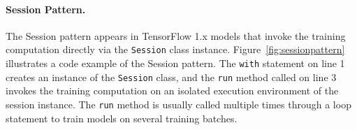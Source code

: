




\paragraph{Session Pattern.} 
The Session pattern appears in TensorFlow 1.x models that invoke the training
computation directly via the {\tt Session} class instance.
Figure~\ref{fig:sessionpattern} illustrates a code example of the Session
pattern. 
The {\tt with} statement on line 1 creates an instance of the {\tt Session}
class, and the {\tt run} method called on line 3 invokes the training
computation on an isolated execution environment of the session instance. 
The {\tt run} method is usually called multiple times through a loop statement
to train models on several training batches.
\vspace{-1em} 


